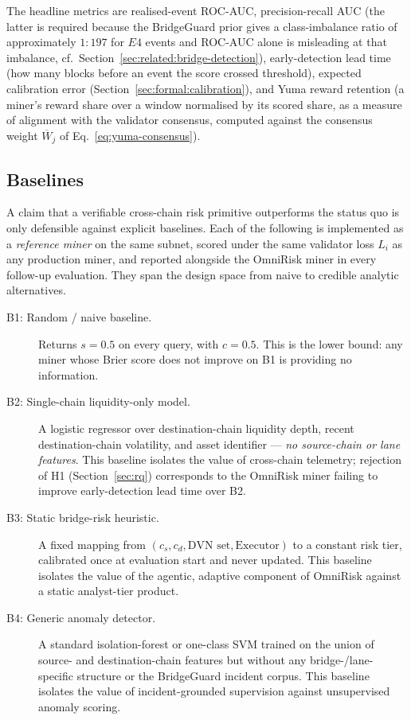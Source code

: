 \documentclass[11pt,a4paper]{article}
\begin{document}
The headline metrics are realised-event ROC-AUC, precision-recall AUC (the latter is
required because the BridgeGuard prior gives a class-imbalance ratio of approximately
$1{:}197$ for $E4$ events and ROC-AUC alone is misleading at that imbalance,
cf.~Section~\ref{sec:related:bridge-detection}), early-detection lead time (how many
blocks before an event the score crossed threshold), expected calibration error
(Section~\ref{sec:formal:calibration}), and Yuma reward retention (a miner's reward share
over a window normalised by its scored share, as a measure of alignment with the
validator consensus, computed against the consensus weight $\overline{W}_j$ of
Eq.~\eqref{eq:yuma-consensus}).

\subsection{Baselines}\label{sec:eval:baselines}

A claim that a verifiable cross-chain risk primitive outperforms the status quo is only
defensible against explicit baselines. Each of the following is implemented as a
\emph{reference miner} on the same subnet, scored under the same validator loss
$L_i$ as any production miner, and reported alongside the OmniRisk miner in every
follow-up evaluation. They span the design space from naive to credible analytic
alternatives.

\begin{description}
  \item[B1: Random / naive baseline.] Returns $s = 0.5$ on every query, with
        $c = 0.5$. This is the lower bound: any miner whose Brier score does not improve
        on B1 is providing no information.
  \item[B2: Single-chain liquidity-only model.] A logistic regressor over destination-chain
        liquidity depth, recent destination-chain volatility, and asset identifier ---
        \emph{no source-chain or lane features}. This baseline isolates the value of
        cross-chain telemetry; rejection of H1 (Section~\ref{sec:rq}) corresponds to the
        OmniRisk miner failing to improve early-detection lead time over B2.
  \item[B3: Static bridge-risk heuristic.] A fixed mapping from
        $(c_s, c_d, \text{DVN set}, \text{Executor})$ to a constant risk tier, calibrated
        once at evaluation start and never updated. This baseline isolates the value of
        the agentic, adaptive component of OmniRisk against a static analyst-tier
        product.
  \item[B4: Generic anomaly detector.] A standard isolation-forest or one-class SVM
        trained on the union of source- and destination-chain features but without any
        bridge-/lane-specific structure or the BridgeGuard incident corpus. This baseline
        isolates the value of incident-grounded supervision against unsupervised
        anomaly scoring.
\end{description}
\end{document}

